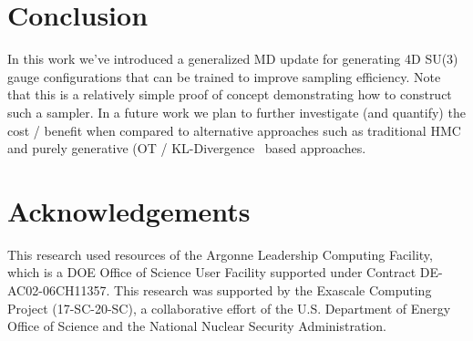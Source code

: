 \documentclass[a4paper,11pt]{article}
\begin{document}
\section{\label{sec:conclusion}Conclusion}
%
In this work we've introduced a generalized MD update for generating 4D SU(3) gauge configurations that can be trained to improve sampling efficiency.
%
Note that this is a relatively simple proof of concept demonstrating how to construct such a sampler.
%
In a future work we plan to further investigate (and quantify) the cost / benefit when compared to alternative approaches such as traditional HMC and purely generative (OT / KL-Divergence~\cite{albergo_flow-based_2019,albergo_introduction_2021,boyda_sampling_2021,kanwar_equivariant_2020} based approaches.
%
%
\section{\label{sec:acknowledgements}Acknowledgements}
This research used resources of the Argonne Leadership Computing Facility,
which is a DOE Office of Science User Facility supported under Contract DE-AC02-06CH11357.
%
This research was supported by the Exascale Computing Project (17-SC-20-SC), a collaborative effort of the U.S. Department of Energy Office of Science and the National Nuclear Security Administration.
%
%
\nocite{*}
{}



\appendix
%
\end{document}
